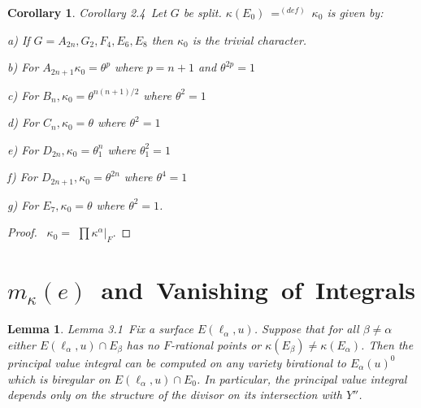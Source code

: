\documentclass{memo-l}
\newtheorem{lemma}[theorem]{Lemma}
\newtheorem{corollary}[theorem]{Corollary}
\theoremstyle{definition}
\theoremstyle{remark}
\numberwithin{section}{chapter}
\numberwithin{equation}{chapter}
\begin{document}
{\medskip}

\begin{corollary}{Corollary 2.4}\  Let $G$ be split.
${\kappa}(E_{0})\ {\mathrel{\mathop=^{(def)}}}\ {\kappa}_{0}$ is given by:

a) If $G = A_{2n}, G_{2}, F_{4}, E_{6}, E_{8}$ then ${\kappa}_{0}$ is the
trivial character.

b) For $A_{2n+1} {\kappa}_{0}  =  {\theta}^{p}$ where $p = n+1$ and
${\theta}^{2p} = 1$

c) For $B_{n}, {\kappa}_{0}  =  {\theta}^{n(n+1)/2}$ where
${\theta}^{2} = 1$

d) For $C_{n}, {\kappa}_{0}  =  {\theta}$ where ${\theta}^{2} = 1$

e) For $D_{2n}, {\kappa}_{0}  =  {\theta}_{1}^{n}$ where ${\theta}_{1}^{2} = 1$

f) For $D_{2n+1}, {\kappa}_{0}  =  {\theta}^{2n}$ where ${\theta}^{4} = 1$

g) For $E_{7}, {\kappa}_{0}  =  {\theta}$ where ${\theta}^{2} = 1$.
\end{corollary}


\begin{proof} \  ${\kappa}_{0}  = $ $\prod{\kappa}^{{\alpha}}\vert_{F} .$
\end{proof} 


\section{$m_{{\kappa}}(e)$\ and\ Vanishing\ of\ Integrals}


\begin{lemma}{Lemma 3.1}\ Fix a surface $E({\ell}_{{\alpha}},u)$.  Suppose
that for all ${\beta} \ne {\alpha}$ either $E({\ell}_{{\alpha}},u)  \cap 
E_{{\beta}}$ has no $F$-rational points or ${\kappa}(E_{{\beta}})  \ne
{\kappa}(E_{{\alpha}})$.  Then the principal value integral can be computed
on any variety birational to $E_{{\alpha}}(u)^{0}$ which is biregular on
$E({\ell}_{{\alpha}},u)  \cap  E_{0}$.  In particular, the principal value
integral depends only on the structure of the divisor on its intersection
with $Y''$.
\end{lemma}
\end{document}
